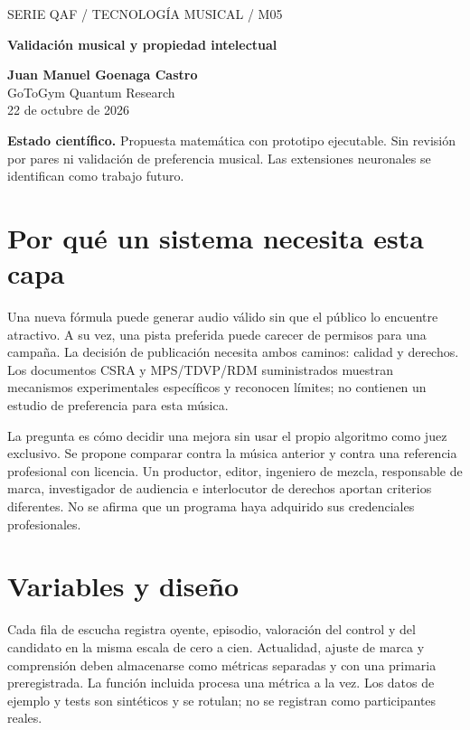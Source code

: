 \documentclass[11pt,a4paper]{article}
\begin{document}
\begin{center}{\sffamily\small\textcolor{mint}{SERIE QAF / TECNOLOGÍA MUSICAL / M05}}\par\vspace{8pt}
{\sffamily\LARGE\bfseries\textcolor{ink}{Validación musical y propiedad intelectual}}\par\vspace{10pt}
\textbf{Juan Manuel Goenaga Castro}\\GoToGym Quantum Research\\22 de octubre de 2026
\end{center}
\colorbox{ink!6}{\parbox{.96\linewidth}{\small\textbf{Estado científico.} Propuesta matemática con prototipo ejecutable. Sin revisión por pares ni validación de preferencia musical. Las extensiones neuronales se identifican como trabajo futuro.}}
\begin{abstract}
Se propone cerrar el ciclo de mejora musical con evaluación pareada, trazabilidad de activos y límites explícitos a las afirmaciones. El prototipo implementa bootstrap por oyente y verificación declarativa de procedencia ligada al hash del archivo. No sustituye una revisión contractual ni aprueba automáticamente una campaña. Se formula un mapa de uso QAF condicionado a evidencia, con opciones de empate o no uso. El resultado permite distinguir software correcto, música preferida y mejora comercial.
\end{abstract}
\section{Por qué un sistema necesita esta capa}
Una nueva fórmula puede generar audio válido sin que el público lo encuentre atractivo. A su vez, una pista preferida puede carecer de permisos para una campaña. La decisión de publicación necesita ambos caminos: calidad y derechos. Los documentos CSRA y MPS/TDVP/RDM suministrados muestran mecanismos experimentales específicos y reconocen límites; no contienen un estudio de preferencia para esta música.

La pregunta es cómo decidir una mejora sin usar el propio algoritmo como juez exclusivo. Se propone comparar contra la música anterior y contra una referencia profesional con licencia. Un productor, editor, ingeniero de mezcla, responsable de marca, investigador de audiencia e interlocutor de derechos aportan criterios diferentes. No se afirma que un programa haya adquirido sus credenciales profesionales.
\section{Variables y diseño}
Cada fila de escucha registra oyente, episodio, valoración del control y del candidato en la misma escala de cero a cien. Actualidad, ajuste de marca y comprensión deben almacenarse como métricas separadas y con una primaria preregistrada. La función incluida procesa una métrica a la vez. Los datos de ejemplo y tests son sintéticos y se rotulan; no se registran como participantes reales.
\end{document}
